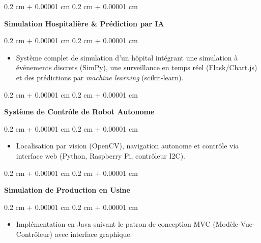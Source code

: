 \documentclass[10pt, a4]{article}
\newenvironment{highlights}{
    \begin{itemize}[
        topsep=0.10 cm,
        parsep=0.10 cm,
        partopsep=0pt,
        itemsep=0pt,
        leftmargin=0.4 cm + 10pt
    ]
}{
    \end{itemize}
} %
\newenvironment{onecolentry}{
    \begin{adjustwidth}{
        0.2 cm + 0.00001 cm
    }{
        0.2 cm + 0.00001 cm
    }
}{
    \end{adjustwidth}
} %
\begin{document}
        \begin{onecolentry}
            \textbf{Simulation Hospitalière \& Prédiction par IA}
        \end{onecolentry}
        \vspace{0.05 cm}
        \begin{onecolentry}
            \begin{highlights}
                \item Système complet de simulation d'un hôpital intégrant une
                    simulation à événements discrets (SimPy), une surveillance
                    en temps réel (Flask/Chart.js) et des prédictions par
                    \textit{machine learning} (scikit-learn).
            \end{highlights}
        \end{onecolentry}
        \vspace{0.2 cm}

        \begin{onecolentry}
            \textbf{Système de Contrôle de Robot Autonome}
        \end{onecolentry}
        \vspace{0.05 cm}
        \begin{onecolentry}
            \begin{highlights}
                \item Localisation par vision (OpenCV), navigation autonome et
                    contrôle via interface web (Python, Raspberry Pi, contrôleur
                    I2C).
            \end{highlights}
        \end{onecolentry}
        \vspace{0.2 cm}

        \begin{onecolentry}
            \textbf{Simulation de Production en Usine}
        \end{onecolentry}
        \vspace{0.05 cm}
        \begin{onecolentry}
            \begin{highlights}
                \item Implémentation en Java suivant le patron de conception MVC
                    (Modèle-Vue-Contrôleur) avec interface graphique.
            \end{highlights}
        \end{onecolentry}
\end{document}
